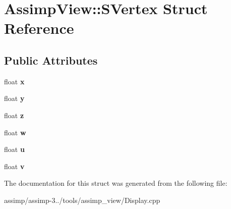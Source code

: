 \hypertarget{struct_assimp_view_1_1_s_vertex}{\section{Assimp\+View\+:\+:S\+Vertex Struct Reference}
\label{struct_assimp_view_1_1_s_vertex}
}
\subsection*{Public Attributes}
\begin{DoxyCompactItemize}
\item 
\hypertarget{struct_assimp_view_1_1_s_vertex_a2993b5ee817532a66b630b65d1bb36ac}{float {\bfseries x}}\label{struct_assimp_view_1_1_s_vertex_a2993b5ee817532a66b630b65d1bb36ac}

\item 
\hypertarget{struct_assimp_view_1_1_s_vertex_af13e953859dd98e92b758ba165aca4b0}{float {\bfseries y}}\label{struct_assimp_view_1_1_s_vertex_af13e953859dd98e92b758ba165aca4b0}

\item 
\hypertarget{struct_assimp_view_1_1_s_vertex_a1937002af2d1d59483b85e9ab16f112b}{float {\bfseries z}}\label{struct_assimp_view_1_1_s_vertex_a1937002af2d1d59483b85e9ab16f112b}

\item 
\hypertarget{struct_assimp_view_1_1_s_vertex_a37350c2bc37d8efc60d87078f8a0a89b}{float {\bfseries w}}\label{struct_assimp_view_1_1_s_vertex_a37350c2bc37d8efc60d87078f8a0a89b}

\item 
\hypertarget{struct_assimp_view_1_1_s_vertex_af01e7161593060cce14d69f2efa6da72}{float {\bfseries u}}\label{struct_assimp_view_1_1_s_vertex_af01e7161593060cce14d69f2efa6da72}

\item 
\hypertarget{struct_assimp_view_1_1_s_vertex_a25a690792a08b1056f574a99d3b56a85}{float {\bfseries v}}\label{struct_assimp_view_1_1_s_vertex_a25a690792a08b1056f574a99d3b56a85}

\end{DoxyCompactItemize}


The documentation for this struct was generated from the following file\+:\begin{DoxyCompactItemize}
\item 
assimp/assimp-\/3../tools/assimp\+\_\+view/Display.\+cpp\end{DoxyCompactItemize}
